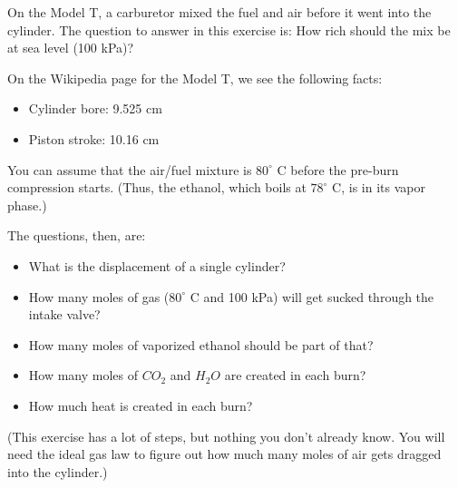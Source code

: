 \begin{Exercise}[title={Fuel Mix for the Model T},  label=fuelmix]

On the Model T, a carburetor mixed the fuel and air before it went into the cylinder.   The question to answer in this exercise is: How rich should the mix be at sea level (100 kPa)?

On the Wikipedia page for the Model T,  we see the following facts:
\begin{itemize}
\item Cylinder bore: 9.525 cm
\item Piston stroke: 10.16 cm
\end{itemize}

You can assume that the air/fuel mixture is $80^\circ$ C before the pre-burn compression starts.  (Thus, the ethanol,  which boils at $78^\circ$ C, is in its vapor phase.)

The questions, then, are:

\begin{itemize}
\item What is the displacement of a single cylinder?
\item How many moles of gas ($80^\circ$ C and 100 kPa) will get sucked through the intake valve?
\item How many moles of vaporized ethanol should be part of that?
\item How many moles of $CO_2$  and  $H_2O$ are created in each burn?
\item How much heat is created in each burn?
\end{itemize}

(This exercise has a lot of steps, but nothing you don't already know.  You will need the ideal gas law to figure out how much many moles of air gets dragged into the cylinder.)

\end{Exercise}

